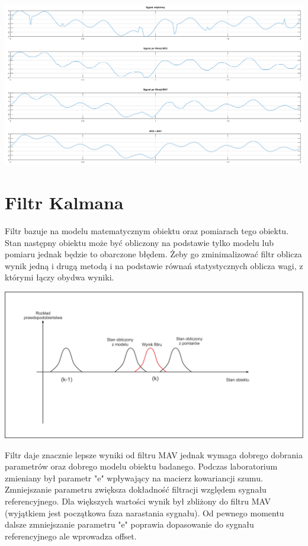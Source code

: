 \documentclass[11pt]{article}
\begin{document}
\begin{center}
	\includegraphics[width=15cm]{med2.png}
\end{center}

\section{Filtr Kalmana}
Filtr bazuje na modelu matematycznym obiektu oraz pomiarach tego obiektu. Stan następny obiektu może być obliczony na podstawie tylko modelu lub pomiaru jednak będzie to obarczone błędem. Żeby go zminimalizować filtr oblicza wynik jedną i drugą metodą i na podstawie równań statystycznych oblicza wagi, z którymi łączy obydwa wyniki.

\begin{center}
	\includegraphics{kalman3.png}
\end{center}

Filtr daje  znacznie lepsze wyniki od filtru MAV jednak wymaga dobrego dobrania parametrów oraz dobrego modelu obiektu badanego. Podczas laboratorium zmieniany był parametr "e" wpływający na macierz kowariancji szumu. Zmniejszanie parametru zwiększa dokładność filtracji względem sygnału referencyjnego. Dla większych wartości wynik był zbliżony do filtru MAV (wyjątkiem jest początkowa faza narastania sygnału). Od pewnego momentu dalsze zmniejszanie parametru "e" poprawia dopasowanie do sygnału referencyjnego ale wprowadza offset.
\end{document}

